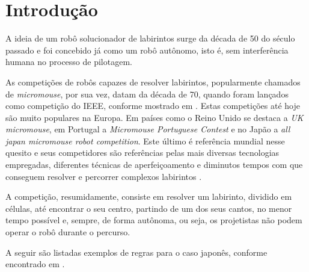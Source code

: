 \chapter{Introdução} \label{cap:introducao}
\setcounter{table}{0}
    A ideia de um robô solucionador de labirintos surge da década de 50 do século passado e foi concebido já como um robô autônomo, isto é, sem interferência humana no processo de pilotagem. 
    
    As competições de robôs capazes de resolver labirintos, popularmente chamados de \textit{micromouse}, por sua vez, datam da década de 70, quando foram lançados como competição do \gls{IEEE}, conforme mostrado em . Estas competições até hoje são muito populares na Europa. Em países como o Reino Unido se destaca a \textit{UK micromouse}, em Portugal a \textit{Micromouse Portuguese Contest} e no Japão a \textit{all japan micromouse robot competition}. Este último é referência mundial nesse quesito e seus competidores são referências pelas mais diversas tecnologias empregadas, diferentes técnicas de aperfeiçoamento e diminutos tempos com que conseguem resolver e percorrer complexos labirintos \cite{borges2013micromouse}.

    A competição, resumidamente, consiste em resolver um labirinto, dividido em células, até encontrar o seu centro, partindo de um dos seus cantos, no menor tempo possível e, sempre, de forma autônoma, ou seja, os projetistas não podem operar o robô durante o percurso. 
    
    A seguir são listadas exemplos de regras para o caso japonês, conforme encontrado em .


